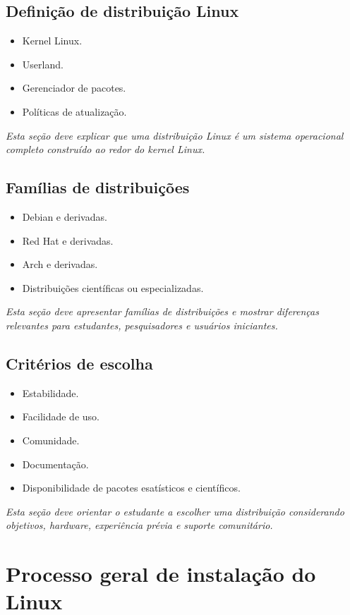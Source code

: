 \documentclass[12pt,openany]{book}
\newcommand{\placeholder}[1]{
    \par\medskip
    \noindent\textit{#1}
    \par\medskip
}
\newcommand{\topicos}[1]{
    \begin{itemize}
        #1
    \end{itemize}
}
\begin{document}
\begin{refsection}
\section{Definição de distribuição Linux}

\topicos{
    \item Kernel Linux.
    \item Userland.
    \item Gerenciador de pacotes.
    \item Políticas de atualização.
}

\placeholder{Esta seção deve explicar que uma distribuição Linux é um sistema operacional completo construído ao redor do kernel Linux.}

\section{Famílias de distribuições}

\topicos{
    \item Debian e derivadas.
    \item Red Hat e derivadas.
    \item Arch e derivadas.
    \item Distribuições científicas ou especializadas.
}

\placeholder{Esta seção deve apresentar famílias de distribuições e mostrar diferenças relevantes para estudantes, pesquisadores e usuários iniciantes.}

\section{Critérios de escolha}

\topicos{
    \item Estabilidade.
    \item Facilidade de uso.
    \item Comunidade.
    \item Documentação.
    \item Disponibilidade de pacotes esatísticos e científicos.
}

\placeholder{Esta seção deve orientar o estudante a escolher uma distribuição considerando objetivos, hardware, experiência prévia e suporte comunitário.}

\chapter{Processo geral de instalação do Linux}


\end{refsection}
\end{document}
